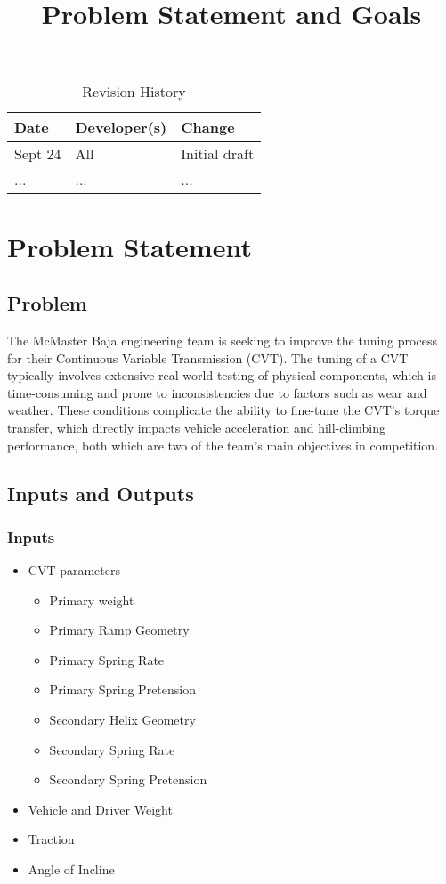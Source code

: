\documentclass{article}
\title{Problem Statement and Goals\\\progname}
\author{\authname}
\date{}
\begin{document}
\maketitle

\begin{table}[hp]
\caption{Revision History} \label{TblRevisionHistory}
\begin{tabularx}{\textwidth}{llX}
\toprule
\textbf{Date} & \textbf{Developer(s)} & \textbf{Change}\\
\midrule
Sept 24 & All & Initial draft\\
... & ... & ...\\
\bottomrule
\end{tabularx}
\end{table}

\section{Problem Statement}

\subsection{Problem}
The McMaster Baja engineering team is seeking to improve the tuning process for their Continuous Variable Transmission (CVT). The tuning of a CVT typically involves extensive real-world testing of physical components, which is time-consuming and prone to inconsistencies due to factors such as wear and weather. These conditions complicate the ability to fine-tune the CVT’s torque transfer, which directly impacts vehicle acceleration and hill-climbing performance, both which are two of the team's main objectives in competition.


\subsection{Inputs and Outputs}

\subsubsection{Inputs}
\begin{itemize}
    \item CVT parameters
    \begin{itemize}
        \item Primary weight
        \item Primary Ramp Geometry
        \item Primary Spring Rate
        \item Primary Spring Pretension
        \item Secondary Helix Geometry
        \item Secondary Spring Rate
        \item Secondary Spring Pretension
    \end{itemize}
    \item Vehicle and Driver Weight
    \item Traction
    \item Angle of Incline
\end{itemize}
\end{document}
